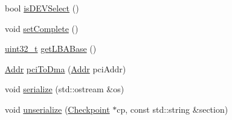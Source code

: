 \begin{DoxyCompactItemize}
bool \hyperlink{classIdeDisk_a910d3c770ea864b505ae99ee7e674640}{isDEVSelect} ()
\item 
void \hyperlink{classIdeDisk_a57e01c0e3593bc187fa343f761ec895a}{setComplete} ()
\item 
\hyperlink{Type_8hh_a435d1572bf3f880d55459d9805097f62}{uint32\_\-t} \hyperlink{classIdeDisk_af02a88c6960b020d71b0d6b95e41bab1}{getLBABase} ()
\item 
\hyperlink{base_2types_8hh_af1bb03d6a4ee096394a6749f0a169232}{Addr} \hyperlink{classIdeDisk_a8f2f46748053f3f3686a295cb3552ecd}{pciToDma} (\hyperlink{base_2types_8hh_af1bb03d6a4ee096394a6749f0a169232}{Addr} pciAddr)
\item 
void \hyperlink{classIdeDisk_a53e036786d17361be4c7320d39c99b84}{serialize} (std::ostream \&os)
\item 
void \hyperlink{classIdeDisk_af22e5d6d660b97db37003ac61ac4ee49}{unserialize} (\hyperlink{classCheckpoint}{Checkpoint} $\ast$cp, const std::string \&section)
\end{DoxyCompactItemize}
